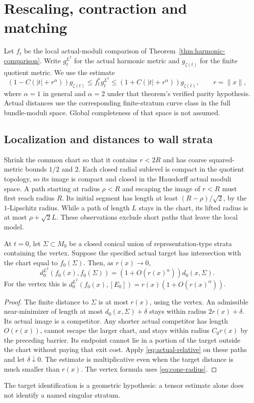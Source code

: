 \section{Rescaling, contraction and matching}\label{sec:rescaling}

Let $f_t$ be the local actual-moduli comparison of
Theorem~\ref{thm:harmonic-comparison}. Write $g_t^{L^2}$ for the
actual harmonic metric and $g_{\zeta(t)}$ for the finite quotient metric.
We use the estimate
\begin{equation}\label{eq:actual-relative}
 (1-C(|t|+r^\alpha))g_{\zeta(t)}
 \le f_t^*g_t^{L^2}
 \le(1+C(|t|+r^\alpha))g_{\zeta(t)},\qquad r=\|x\|,
\end{equation}
where $\alpha=1$ in general and $\alpha=2$ under that theorem's
verified parity hypothesis. Actual distances use the corresponding
finite-stratum curve class in the full bundle-moduli space.
Global completeness of that space is not assumed.

\subsection{Localization and distances to wall strata}
Shrink the common chart so that it contains $r<2R$ and has coarse
squared-metric bounds $1/2$ and $2$. Each closed radial sublevel
is compact in the quotient topology, so its image is compact and
closed in the Hausdorff actual moduli space.
A path starting at radius $\rho<R$ and escaping the image of $r<R$
must first reach radius $R$. Its initial segment has length at
least $(R-\rho)/\sqrt2$, by the $1$-Lipschitz radius.
While a path of length $L$ stays in the chart, its lifted radius
is at most $\rho+\sqrt2L$. These observations exclude short paths
that leave the local model.

\begin{proposition}\label{prop:stratum-distance}
At $t=0$, let $\Sigma\subset M_0$ be a closed conical union of
representation-type strata containing the vertex. Suppose the
specified actual target has intersection with the chart equal to
$f_0(\Sigma)$. Then, as $r(x)\to0$,
\[
 d^{L^2}_0(f_0(x),f_0(\Sigma))
  =(1+O(r(x)^\alpha))d_0(x,\Sigma).
\]
For the vertex this is
$d^{L^2}_0(f_0(x),[E_0])=r(x)(1+O(r(x)^\alpha))$.
\end{proposition}
\begin{proof}
The finite distance to $\Sigma$ is at most $r(x)$, using the vertex.
An admissible near-minimizer of length at most $d_0(x,\Sigma)+\delta$
stays within radius $2r(x)+\delta$. Its actual image is a competitor.
Any shorter actual competitor has length $O(r(x))$, cannot escape
the larger chart, and stays within radius $C_0r(x)$ by the preceding
barrier. Its endpoint cannot lie in a portion of the target outside
the chart without paying that exit cost.
Apply \eqref{eq:actual-relative} on these paths and let $\delta\downarrow0$.
The estimate is multiplicative even when the target distance is much
smaller than $r(x)$. The vertex formula uses \eqref{eq:cone-radius}.
\end{proof}
The target identification is a geometric hypothesis: a tensor estimate
alone does not identify a named singular stratum.

